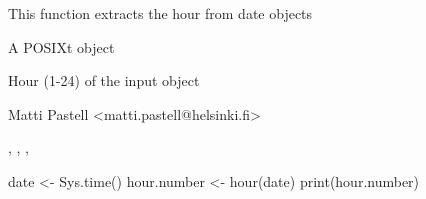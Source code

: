 \begin{Description}\relax
This function extracts the hour from date objects
\end{Description}
\begin{Arguments}
\begin{ldescription}
\item[\code{x}] A POSIXt object
\end{ldescription}
\end{Arguments}
\begin{Value}
\begin{ldescription}
\item[\code{hour}] Hour (1-24) of the input object
\end{ldescription}
\end{Value}
\begin{Author}\relax
Matti Pastell <matti.pastell@helsinki.fi>
\end{Author}
\begin{SeeAlso}\relax
{}, ,
, 
\end{SeeAlso}
\begin{Examples}
\begin{ExampleCode}
date <- Sys.time()
hour.number <- hour(date)
print(hour.number)
\end{ExampleCode}
\end{Examples}

